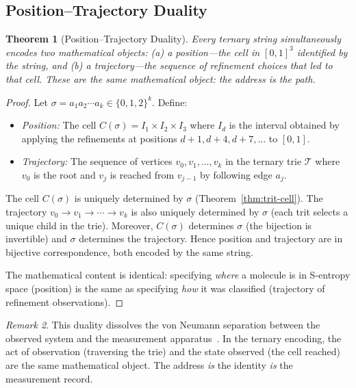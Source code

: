 \documentclass[11pt,twocolumn,a4paper]{article}
\newtheorem{theorem}{Theorem}[section]
\theoremstyle{definition}
\theoremstyle{remark}
\newtheorem{remark}[theorem]{Remark}
\newcommand{\Trie}{\mathcal{T}}
\begin{document}
\subsection{Position--Trajectory Duality}
\label{sec:position-trajectory}

\begin{theorem}[Position--Trajectory Duality]
\label{thm:position-trajectory}
Every ternary string simultaneously encodes two mathematical objects: (a) a \emph{position}---the cell in $[0,1]^3$ identified by the string, and (b) a \emph{trajectory}---the sequence of refinement choices that led to that cell. These are the same mathematical object: the address \emph{is} the path.
\end{theorem}

\begin{proof}
Let $\sigma = a_1 a_2 \cdots a_k \in \{0,1,2\}^k$. Define:
\begin{itemize}
  \item \emph{Position:} The cell $C(\sigma) = I_1 \times I_2 \times I_3$ where $I_d$ is the interval obtained by applying the refinements at positions $d+1, d+4, d+7, \ldots$ to $[0,1]$.
  \item \emph{Trajectory:} The sequence of vertices $v_0, v_1, \ldots, v_k$ in the ternary trie $\Trie$ where $v_0$ is the root and $v_j$ is reached from $v_{j-1}$ by following edge $a_j$.
\end{itemize}

The cell $C(\sigma)$ is uniquely determined by $\sigma$ (Theorem~\ref{thm:trit-cell}). The trajectory $v_0 \to v_1 \to \cdots \to v_k$ is also uniquely determined by $\sigma$ (each trit selects a unique child in the trie). Moreover, $C(\sigma)$ determines $\sigma$ (the bijection is invertible) and $\sigma$ determines the trajectory. Hence position and trajectory are in bijective correspondence, both encoded by the same string.

The mathematical content is identical: specifying \emph{where} a molecule is in S-entropy space (position) is the same as specifying \emph{how} it was classified (trajectory of refinement observations).
\end{proof}

\begin{remark}
This duality dissolves the von Neumann separation between the observed system and the measurement apparatus~\citep{vonneumann1945}. In the ternary encoding, the act of observation (traversing the trie) and the state observed (the cell reached) are the same mathematical object. The address \emph{is} the identity \emph{is} the measurement record.
\end{remark}
\end{document}

